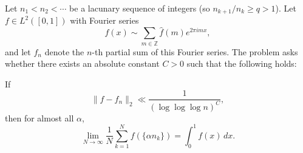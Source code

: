 Let $n_1<n_2<\cdots$ be a lacunary sequence of integers (so $n_{k+1}/n_k\ge q>1$).  Let $f\in L^2([0,1])$ with Fourier series
\[
 f(x)\sim \sum_{m\in\mathbb{Z}} \widehat f(m)e^{2\pi i m x},
\]
and let $f_n$ denote the $n$-th partial sum of this Fourier series.  The problem asks whether there exists an absolute constant $C>0$ such that the following holds:

If
\[
 \|f-f_n\|_2 \ll \frac{1}{(\log\log\log n)^C},
\]
then for almost all $\alpha$,
\[
 \lim_{N\to\infty}\frac{1}{N}\sum_{k=1}^N f(\{\alpha n_k\}) = \int_0^1 f(x)\,dx.
\]
